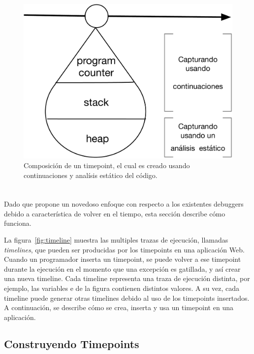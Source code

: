 \documentclass[conference]{IEEEtran}
\begin{document}
\begin{figure}[t]
\begin{center}
\includegraphics[width=.55\linewidth]{fig-timepoint}
\caption{Composici\'on de un timepoint, el cual es creado usando continuaciones y anal\'isis est\'atico del c\'odigo.}
\label{fig:timepoint}
\end{center}
\end{figure}


\section{\deloreanjs}
\label{sec:deloreanjs}

Dado que \deloreanjs propone un novedoso enfoque con respecto a los existentes debuggers debido a caracter\'istica de volver en el tiempo, esta secci\'on describe c\'omo funciona. 

\smallskip

La figura~\ref{fig:timeline} muestra las multiples trazas de ejecuci\'on, llamadas {\em timelines}, que pueden ser producidas por los timepoints en una aplicaci\'on Web. Cuando un programador inserta un timepoint, se puede volver a ese timepoint durante la ejecuci\'on en el momento que una excepci\'on es gatillada, y as\'i crear una nueva timeline. Cada timeline representa una traza de ejecuci\'on distinta, por ejemplo, las variables  e  de la figura contienen distintos valores. A su vez, cada timeline puede generar otras timelines debido al uso de los timepoints insertados. A continuaci\'on, se describe c\'omo se crea, inserta y usa un timepoint en una aplicaci\'on.  

\subsection{Construyendo Timepoints}
\label{sec:ctime}


\end{document}
